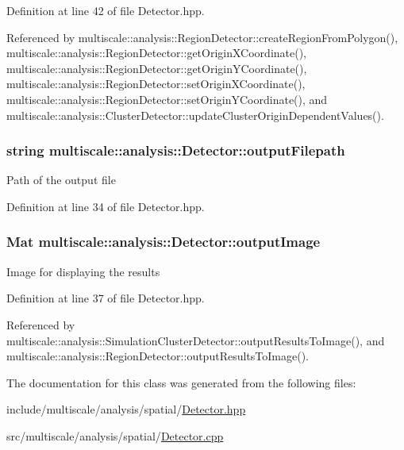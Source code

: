 Definition at line 42 of file Detector.\-hpp.



Referenced by multiscale\-::analysis\-::\-Region\-Detector\-::create\-Region\-From\-Polygon(), multiscale\-::analysis\-::\-Region\-Detector\-::get\-Origin\-X\-Coordinate(), multiscale\-::analysis\-::\-Region\-Detector\-::get\-Origin\-Y\-Coordinate(), multiscale\-::analysis\-::\-Region\-Detector\-::set\-Origin\-X\-Coordinate(), multiscale\-::analysis\-::\-Region\-Detector\-::set\-Origin\-Y\-Coordinate(), and multiscale\-::analysis\-::\-Cluster\-Detector\-::update\-Cluster\-Origin\-Dependent\-Values().

\hypertarget{classmultiscale_1_1analysis_1_1Detector_a1a83df16d8afd347c0e1c9ddc41c9bee}{
\subsubsection[{output\-Filepath}]{\setlength{\rightskip}{0pt plus 5cm}string multiscale\-::analysis\-::\-Detector\-::output\-Filepath\hspace{0.3cm}{\ttfamily [protected]}}}\label{classmultiscale_1_1analysis_1_1Detector_a1a83df16d8afd347c0e1c9ddc41c9bee}
Path of the output file 

Definition at line 34 of file Detector.\-hpp.

\hypertarget{classmultiscale_1_1analysis_1_1Detector_a144e080a3af03c9bf3d8a80315823c86}{
\subsubsection[{output\-Image}]{\setlength{\rightskip}{0pt plus 5cm}Mat multiscale\-::analysis\-::\-Detector\-::output\-Image\hspace{0.3cm}{\ttfamily [protected]}}}\label{classmultiscale_1_1analysis_1_1Detector_a144e080a3af03c9bf3d8a80315823c86}
Image for displaying the results 

Definition at line 37 of file Detector.\-hpp.



Referenced by multiscale\-::analysis\-::\-Simulation\-Cluster\-Detector\-::output\-Results\-To\-Image(), and multiscale\-::analysis\-::\-Region\-Detector\-::output\-Results\-To\-Image().



The documentation for this class was generated from the following files\-:\begin{DoxyCompactItemize}
\item 
include/multiscale/analysis/spatial/\hyperlink{Detector_8hpp}{Detector.\-hpp}\item 
src/multiscale/analysis/spatial/\hyperlink{Detector_8cpp}{Detector.\-cpp}\end{DoxyCompactItemize}
